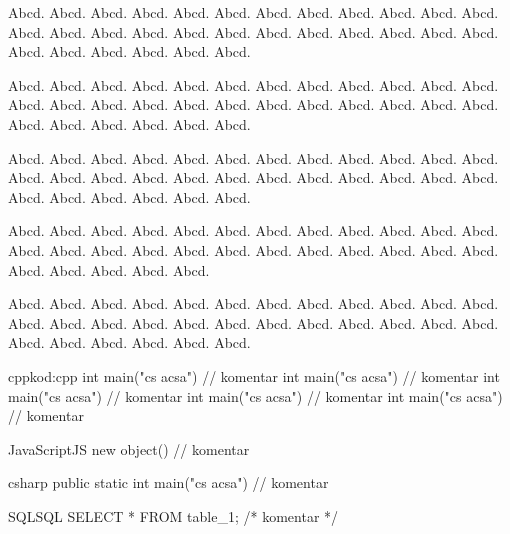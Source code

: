 \documentclass[
  field=inf,
  biblatex,
  glossaries,
  index
]{kidiplom}
\begin{document}
\begin{remark}
Abcd. Abcd. Abcd. Abcd. Abcd. Abcd. Abcd. Abcd. Abcd. Abcd. Abcd. Abcd. Abcd. Abcd. Abcd. Abcd. Abcd. Abcd. Abcd. Abcd. Abcd. Abcd. Abcd. Abcd. Abcd. Abcd. Abcd. Abcd. Abcd. Abcd. 
\end{remark}

\begin{example}
Abcd. Abcd. Abcd. Abcd. Abcd. Abcd. Abcd. Abcd. Abcd. Abcd. Abcd. Abcd. Abcd. Abcd. Abcd. Abcd. Abcd. Abcd. Abcd. Abcd. Abcd. Abcd. Abcd. Abcd. Abcd. Abcd. Abcd. Abcd. Abcd. Abcd. 
\end{example}

\begin{lemma}
Abcd. Abcd. Abcd. Abcd. Abcd. Abcd. Abcd. Abcd. Abcd. Abcd. Abcd. Abcd. Abcd. Abcd. Abcd. Abcd. Abcd. Abcd. Abcd. Abcd. Abcd. Abcd. Abcd. Abcd. Abcd. Abcd. Abcd. Abcd. Abcd. Abcd. 
\end{lemma}

\begin{consequence}
Abcd. Abcd. Abcd. Abcd. Abcd. Abcd. Abcd. Abcd. Abcd. Abcd. Abcd. Abcd. Abcd. Abcd. Abcd. Abcd. Abcd. Abcd. Abcd. Abcd. Abcd. Abcd. Abcd. Abcd. Abcd. Abcd. Abcd. Abcd. Abcd. 
\end{consequence}

\begin{theorem}
Abcd. Abcd. Abcd. Abcd. Abcd. Abcd. Abcd. Abcd. Abcd. Abcd. Abcd. Abcd. Abcd. Abcd. Abcd. Abcd. Abcd. Abcd. Abcd. Abcd. Abcd. Abcd. Abcd. Abcd. Abcd. Abcd. Abcd. Abcd. Abcd. Abcd. 
\end{theorem}


\begin{kicode}{cpp}{kod:cpp}{\cpp}
int main("cs acsa") // komentar
int main("cs acsa") // komentar
int main("cs acsa") // komentar
int main("cs acsa") // komentar
int main("cs acsa") // komentar
\end{kicode}

\begin{kicode}{JavaScript}{}{JS}
new object() // komentar
\end{kicode}

\begin{kicode}{csharp}{}{\csharp}
public static int main("cs acsa") // komentar
\end{kicode}

\begin{kicode}{SQL}{}{SQL}
SELECT * FROM table_1; /* komentar */
\end{kicode}
\end{document}
